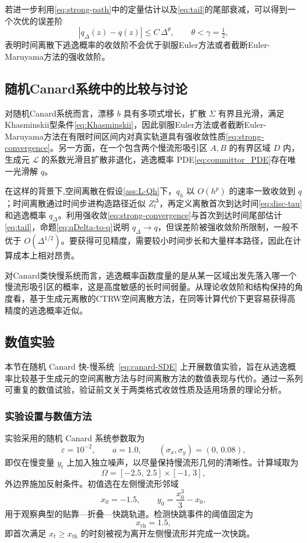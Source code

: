 	若进一步利用\eqref{eq:strong-path}中的定量估计以及\eqref{eq:tail}的尾部衰减，可以得到一个次优的误差阶
	\[
	|q_\Delta(z)-q(z)| \le C\,\Delta^{\theta},\qquad \theta<\gamma=\tfrac12,
	\]
	表明时间离散下逃逸概率的收敛阶不会优于驯服Euler方法或者截断Euler-Maruyama方法的强收敛阶。%
	
	\subsection{随机Canard系统中的比较与讨论}
	
	对随机Canard系统而言，漂移 \(b\) 具有多项式增长，扩散 \(\Sigma\) 有界且光滑，满足Khasminskii型条件\eqref{eq:Khasminskii}，因此驯服Euler方法或者截断Euler-Maruyama方法在有限时间区间内对真实轨道具有强收敛性质\eqref{eq:strong-convergence}。另一方面，在一个包含两个慢流形吸引区 \(A,B\) 的有界区域 \(D\) 内，生成元 \(\mathcal{L}\) 的系数光滑且扩散非退化，逃逸概率 PDE\eqref{eq:committor_PDE}存在唯一光滑解 \(q\)。
	
	在这样的背景下,空间离散在假设\ref{ass:L-Qh}下，\(q_h\) 以 \(O(h^p)\) 的速率一致收敛到 \(q\)；时间离散通过时间步进构造路径近似 \(Z_t^\Delta\)，再定义离散首次到达时间\eqref{eq:disc-tau}和逃逸概率 \(q_\Delta\)。利用强收敛\eqref{eq:strong-convergence}与首次到达时间尾部估计\eqref{eq:tail}，命题\eqref{eq:qDelta-to-q}说明 \(q_\Delta\to q\)，但误差阶被强收敛阶所限制，一般不优于 \(O(\Delta^{1/2})\)。要获得可见精度，需要较小时间步长和大量样本路径，因此在计算成本上相对昂贵。
	
	对Canard类快慢系统而言，逃逸概率函数度量的是从某一区域出发先落入哪一个慢流形吸引区的概率，这是高度敏感的长时间弱量。从理论收敛阶和结构保持的角度看，基于生成元离散的CTRW空间离散方法，在同等计算代价下更容易获得高精度的逃逸概率近似。
	

\subsection{数值实验}\label{sec:canard_cmp}

本节在随机 Canard 快-慢系统~\eqref{eq:canard-SDE} 上开展数值实验，旨在从逃逸概率比较基于生成元的空间离散方法与时间离散方法的数值表现与代价。通过一系列可重复的数值试验，验证前文关于两类格式收敛性质及适用场景的理论分析。

\subsubsection{实验设置与数值方法}

实验采用的随机 Canard 系统参数取为
\[
\varepsilon=10^{-2},\qquad a=1.0,\qquad (\sigma_x,\sigma_y)=(0,\,0.08),
\]
即仅在慢变量 \(y_t\) 上加入独立噪声，以尽量保持慢流形几何的清晰性。计算域取为
\[
\Omega=[-2.5,\,2.5]\times[-1,\,3],
\]
外边界施加反射条件。初值选在左侧慢流形邻域
\[
x_0=-1.5,\qquad y_0=\frac{x_0^3}{3}-x_0,
\]
用于观察典型的贴靠—折叠—快跳轨道。检测快跳事件的阈值固定为
\[
x_{\mathrm{th}}=1.5,
\]
即首次满足 \(x_t\ge x_{\mathrm{th}}\) 的时刻被视为离开左侧慢流形并完成一次快跳。

